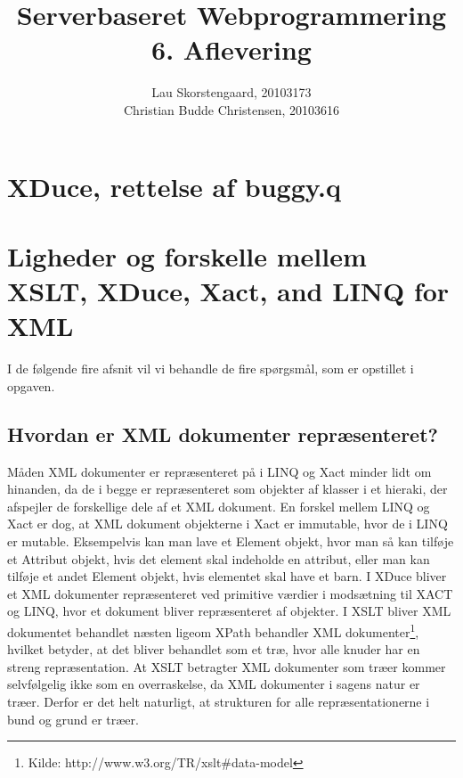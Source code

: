 \documentclass[a4paper,10pt]{article}
\author{Lau Skorstengaard, 20103173 \\Christian Budde Christensen, 20103616}
\title{Serverbaseret Webprogrammering\\6. Aflevering}
\begin{document}
\maketitle
\section{XDuce, rettelse af buggy.q}

\section{Ligheder og forskelle mellem XSLT, XDuce, Xact, and LINQ for XML}
I de følgende fire afsnit vil vi behandle de fire spørgsmål, som er opstillet i opgaven.
\subsection{Hvordan er XML dokumenter repræsenteret?}
Måden XML dokumenter er repræsenteret på i LINQ og Xact minder lidt om hinanden, da de i begge er repræsenteret som objekter af klasser i et hieraki, der afspejler de forskellige dele af et XML dokument. En forskel mellem LINQ og Xact er dog, at XML dokument objekterne i Xact er immutable, hvor de i LINQ er mutable. Eksempelvis kan man lave et Element objekt, hvor man så kan tilføje et Attribut objekt, hvis det element skal indeholde en attribut, eller man kan tilføje et andet Element objekt, hvis elementet skal have et barn. I XDuce bliver et XML dokumenter repræsenteret ved primitive værdier i modsætning til XACT og LINQ, hvor et dokument bliver repræsenteret af objekter. I XSLT bliver XML dokumentet behandlet næsten ligeom XPath behandler XML dokumenter\footnote{Kilde: http://www.w3.org/TR/xslt#data-model}, hvilket betyder, at det bliver behandlet som et træ, hvor alle knuder har en streng repræsentation. At XSLT betragter XML dokumenter som træer kommer selvfølgelig ikke som en overraskelse, da XML dokumenter i sagens natur er træer. Derfor er det helt naturligt, at strukturen for alle repræsentationerne i bund og grund er træer.
\end{document}
